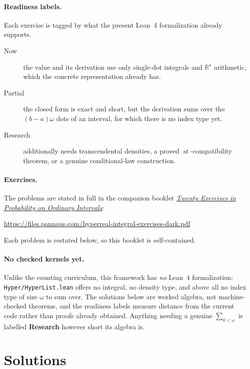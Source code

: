 \documentclass[11pt]{article}
\newcommand{\Rstar}{\mathbb{R}^{\star}}
\newcommand{\st}{\operatorname{st}}
\begin{document}
\paragraph{Readiness labels.} Each exercise is tagged by what the present
Lean~4 formalization already supports.
\begin{description}
\item[Now] the value and its derivation use only single-dot integrals and
$\Rstar$ arithmetic, which the concrete representation already has.
\item[Partial] the closed form is exact and short, but the derivation sums over
the $(b-a)\omega$ dots of an interval, for which there is no index type yet.
\item[Research] additionally needs transcendental densities, a proved
$\st$-compatibility theorem, or a genuine conditional-law construction.
\end{description}

\paragraph{Exercises.} The problems are stated in full in the companion
booklet \href{https://files.pannous.com/hyperreal-integral-exercises-dark.pdf}{\emph{Twenty Exercises in Probability on Ordinary
Intervals}}:
\begin{center}\small\url{https://files.pannous.com/hyperreal-integral-exercises-dark.pdf}\end{center}
Each problem is restated below, so this booklet is self-contained.

\paragraph{No checked kernels yet.} Unlike the counting curriculum, this
framework has \emph{no} Lean~4 formalization: \texttt{Hyper/HyperList.lean}
offers no integral, no density type, and above all no index type of size
$\omega$ to sum over. The solutions below are worked algebra, not machine-checked
theorems, and the readiness labels measure distance from the current code
rather than proofs already obtained. Anything needing a genuine
$\sum_{k<\omega}$ is labelled \textbf{Research} however short its algebra is.


\section*{Solutions}
\end{document}
